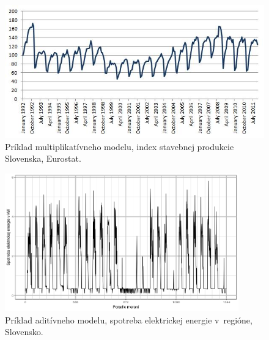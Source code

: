 \documentclass[a4paper,twoside,slovak,12pt,appendix]{article}
\begin{document}
\begin{figure}[H]
  \centering
	\captionsetup{justification=centering}
  \includegraphics[width=\textwidth]{multi_model.jpg}
  \caption[Príklad multiplikatívneho modelu.]{Príklad multiplikatívneho modelu, index stavebnej produkcie Slovenska, Eurostat.}
  \label{fig:multi-time-series-model}
\end{figure}

\begin{figure}[H]
  \centering
  \includegraphics[width=0.9\textwidth]{add_model.png}
  \caption[Príklad aditívneho modelu.]{Príklad aditívneho modelu, spotreba elektrickej energie v~regióne, Slovensko.}
  \label{fig:add-time-series-model}
\end{figure}

\end{document}
